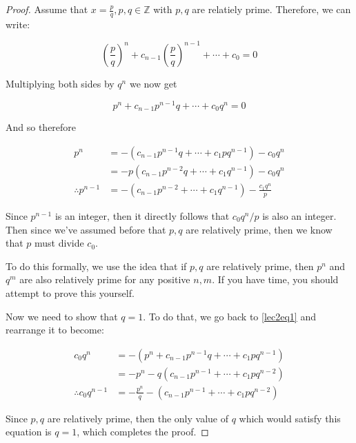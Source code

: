 \begin{proof}
    Assume that $x = \frac pq, p, q \in \mathbb Z$ with $p, q$ are relatiely prime. Therefore, we can write: 

   \[ 
        \left( \frac pq\right)^n + c_{n-1} \left( \frac pq\right)^{n-1} + \cdots + c_0 = 0\]

    Multiplying both sides by $q^n$ we now get


    \begin{equation}
        \label{lec2eq1}
        p^n + c_{n-1}p^{n-1}q + \cdots + c_0q^n = 0
    \end{equation}
    
    And so therefore

    \begin{align*}
        p^n &= -(c_{n-1}p^{n-1}q + \cdots + c_1pq^{n-1}) - c_0q^n\\
        &= -p (c_{n-1} p^{n-2}q + \cdots + c_1q^{n-1}) - c_0q^n\\
        \therefore p^{n-1} &= -(c_{n-1} p^{n-2} + \cdots + c_1q^{n-1}) - \frac{c_1q^{n}}{p}
    \end{align*}

    Since $p^{n-1}$ is an integer, then it directly follows that $c_0q^n/p$ is also an integer. Then since we've assumed before that $p, q$ are relatively prime, then we know that $p$ must divide $c_0$. 

    \begin{remark}{}{}
        To do this formally, we use the idea that if $p, q$ are relatively prime, then $p^n$ and $q^m$ are also relatively prime for any positive $n, m$. If you have time, you should attempt to prove this yourself.
    \end{remark}

    Now we need to show that $q = 1$. To do that, we go back to \cref{lec2eq1} and rearrange it to become: 

    \begin{align*}
        c_0q^n &= -(p^n + c_{n-1}p^{n-1}q + \cdots + c_1pq^{n-1})\\
        &= -p^n - q(c_{n-1}p^{n-1} + \cdots + c_1pq^{n-2})\\
        \therefore c_0q^{n-1} &= -\frac{p^n}{q} - (c_{n-1}p^{n-1} + \cdots +c_1pq^{n-2})
    \end{align*}

    Since $p, q$ are relatively prime, then the only value of $q$ which would satisfy this equation is $q = 1$, which completes the proof.

\end{proof}

